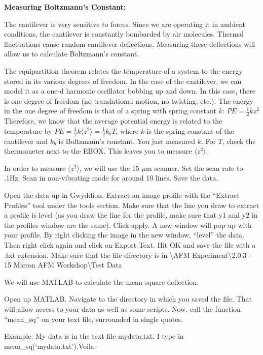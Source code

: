 \documentclass{../lab}
\begin{document}
\textbf{Measuring Boltzmann's Constant:}

The cantilever is very sensitive to forces. Since we are operating it in ambient conditions, the cantilever is constantly bombarded by air molecules. Thermal fluctuations cause random cantilever deflections. Measuring these deflections will allow us to calculate Boltzmann's constant.

The equipartition theorem relates the temperature of a system to the energy stored in its various degrees of freedom. In the case of the cantilever, we can model it as a one-d harmonic oscillator bobbing up and down. In this case, there is one degree of freedom (no translational motion, no twisting, etc.). The energy in the one degree of freedom is that of a spring with spring constant $k$: $PE = \frac{1}{2} k z^2$ Therefore, we know that the average potential energy is related to the temperature by $PE = \frac{1}{2} k \langle z^{2} \rangle = \frac{1}{2} k_b T$, where $k$ is the spring constant of the cantilever and $k_b$ is Boltzmann's constant. You just measured $k$. For $T$, check the thermometer next to the EBOX. This leaves you to measure $\langle z^2 \rangle$.

In order to measure $\langle z^2 \rangle$, we will use the 15 $\mu$m scanner. Set the scan rate to .1Hz. Scan in non-vibrating mode for around 10 lines. Save the data.

Open the data up in Gwyddion. Extract an image profile with the ``Extract Profiles'' tool under the tools section. Make sure that the line you draw to extract a profile is level (as you draw the line for the profile, make sure that y1 and y2 in the profiles window are the same). Click apply. A new window will pop up with your profile.  By right clicking the image in the new window, ``level'' the data. Then right click again and click on Export Text. Hit OK and save the file with a .txt extension. Make sure that the file directory is in \textbackslash AFM Experiment\textbackslash 2.0.3 - 15 Micron AFM Workshop\textbackslash Test Data

We will use MATLAB to calculate the mean square deflection.

Open up MATLAB. Navigate to the directory in which you saved the file. That will allow access to your data as well as some scripts. Now, call the function ``mean\_sq'' on your text file, surrounded in single quotes.

Example: My data is in the text file mydata.txt. I type in mean\_sq(`mydata.txt').Voila.
\end{document}
